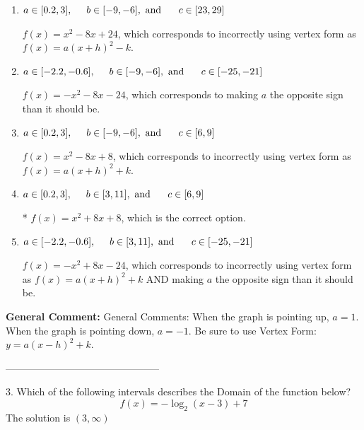 \documentclass{extbook}[14pt]
\begin{document}
\begin{enumerate}[label=\Alph*.] 
\item $ a \in [0.2, 3], \hspace*{5mm} b \in [-9, -6], \text{ and } \hspace*{5mm} c \in [23, 29] $ 

 $f(x)=x^{2} -8 x + 24$, which corresponds to incorrectly using vertex form as $f(x) = a(x+h)^2 - k$. 
\item $ a \in [-2.2, -0.6], \hspace*{5mm} b \in [-9, -6], \text{ and } \hspace*{5mm} c \in [-25, -21] $ 

 $f(x)=-x^{2} -8 x -24$, which corresponds to making $a$ the opposite sign than it should be. 
\item $ a \in [0.2, 3], \hspace*{5mm} b \in [-9, -6], \text{ and } \hspace*{5mm} c \in [6, 9] $ 

 $f(x)=x^{2} -8 x + 8$, which corresponds to incorrectly using vertex form as $f(x) = a(x+h)^2+k$. 
\item $ a \in [0.2, 3], \hspace*{5mm} b \in [3, 11], \text{ and } \hspace*{5mm} c \in [6, 9] $ 

 * $f(x)=x^{2} +8 x + 8$, which is the correct option. 
\item $ a \in [-2.2, -0.6], \hspace*{5mm} b \in [3, 11], \text{ and } \hspace*{5mm} c \in [-25, -21] $ 

 $f(x)=-x^{2} +8 x -24$, which corresponds to incorrectly using vertex form as $f(x) = a(x+h)^2+k$ AND making $a$ the opposite sign than it should be. 
\end{enumerate} 
 
\textbf{General Comment:} General Comments: When the graph is pointing up, $a=1$. When the graph is pointing down, $a=-1$. Be sure to use Vertex Form: $y = a(x-h)^2+k$. 

-----------------------------------------------

3. Which of the following intervals describes the Domain of the function below?
\[ f(x) = -\log_2{(x-3)}+7 \] 
The solution is $ (3, \infty) $ 
\end{document}
